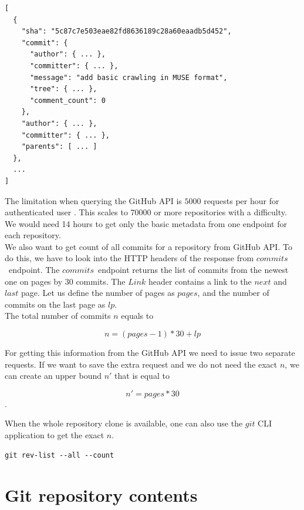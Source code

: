 \documentclass[thesis=M,english]{FITthesis}[2012/10/20]
\begin{document}
\newpage

\lstset{title=GitHub API response from /repos/jakubzitny/big.js/comits endpoint}
\begin{lstlisting}[basicstyle=\tiny]
[
  {
    "sha": "5c87c7e503eae82fd8636189c28a60eaadb5d452",
    "commit": {
      "author": { ... },
      "committer": { ... },
      "message": "add basic crawling in MUSE format",
      "tree": { ... },
      "comment_count": 0
    },
    "author": { ... },
    "committer": { ... },
    "parents": [ ... ]
  },
  ...
]
\end{lstlisting}

The limitation when querying the GitHub API is $5000$ requests per hour for authenticated user \cite{gh_limits}. This scales to $70000$ or more repositories with a difficulty. We would need 14 hours to get only the basic metadata from one endpoint for each repository. \\

We also want to get count of all commits for a repository from GitHub API. To do this, we have to look into the HTTP headers of the response from $commits$ endpoint. The $commits$ endpoint returns the list of commits from the newest one on pages by 30 commits. The $Link$ header contains a link to the $next$ and $last$ page. Let us define the number of pages as $pages$, and the number of commits on the last page as $lp$. \\

The total number of commits $n$ equals to

$$
n = (pages - 1) * 30 + lp
$$

For getting this information from the GitHub API we need to issue two separate requests. If we want to save the extra request and we do not need the exact $n$, we can create an upper bound $n'$ that is equal to

$$
n' = pages * 30
$$.

When the whole repository clone is available, one can also use the $git$ CLI application to get the exact $n$. \\

\lstset{title=Git CLI command to count commits in a repository}
\begin{lstlisting}[basicstyle=\small]
git rev-list --all --count
\end{lstlisting}

\section{Git repository contents}
\end{document}
